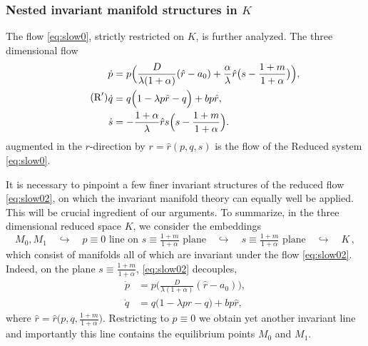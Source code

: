 \documentclass[11pt]{article}
\theoremstyle{remark}
\begin{document}
\subsubsection{Nested invariant manifold structures in $K$}
The flow \eqref{eq:slow0}, strictly restricted on $K$, is further analyzed. The three dimensional flow
\begin{equation}\label{eq:slow02} \tag{$\text{R}^\prime$}
 \begin{aligned}
 \dot{p} &= p\Big(\frac{D}{\lambda(1+\alpha)}(\hat{r}-a_0) + \frac{\alpha}{\lambda}\hat{r}\big(s- \frac{1+m}{1+\alpha}\big) \Big),\\
 \dot{q} &=q\Big(1 -\lambda p \hat{r} -q\Big) + b p \hat{r},\\%
 \dot{s} &= -\frac{1+\alpha}{\lambda}\hat{r}s\Big(s- \frac{1+m}{1+\alpha}\Big).
 \end{aligned}
\end{equation}
augmented in the $r$-direction by $r=\hat{r}(p,q,s)$ is the flow of the Reduced system \eqref{eq:slow0}.

It is necessary to pinpoint a few finer invariant structures of the reduced flow \eqref{eq:slow02}, on which the invariant manifold theory can  equally well be applied.  This will be crucial ingredient of our arguments. To summarize, in the three dimensional reduced space $K$, we
consider the embeddings
$$
M_0, M_1 \quad \hookrightarrow \quad \text{$p\equiv0$ line on $s\equiv\tfrac{1+m}{1+\alpha}$ plane} \quad \hookrightarrow \quad \text{$s\equiv\tfrac{1+m}{1+\alpha}$ plane} \quad \hookrightarrow \quad K \, ,
$$
which consist of manifolds all of which are invariant under the flow \eqref{eq:slow02}. Indeed, on the plane $s\equiv\tfrac{1+m}{1+\alpha}$, \eqref{eq:slow02} decouples,
\begin{equation}\label{eq:slow03}
 \begin{aligned}
 \dot{p} &= p\Big(\frac{D}{\lambda(1+\alpha)}(\hat{r}-a_0)\Big),\\
 \dot{q} &= q\Big(1 -\lambda p \hat{r} -q\Big) + b p \hat{r},
 \end{aligned}
\end{equation}
where $\hat{r}=\hat{r}\big(p,q,\frac{1+m}{1+\alpha}\big)$. Restricting to $p\equiv0$ we obtain yet another invariant line and importantly this line contains
the equilibrium points $M_0$ and $M_1$.
\end{document}
